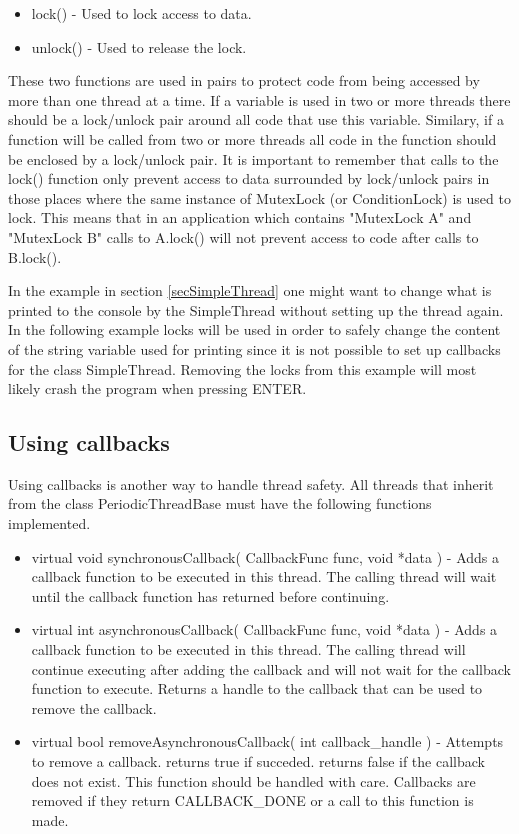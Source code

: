 \begin{itemize}
\item lock() - Used to lock access to data.
\item unlock() - Used to release the lock.
\end{itemize}

These two functions are used in pairs to protect code from being accessed by
more than one thread at a time. If a variable is used in two or more threads
there should be a lock/unlock pair around all code that use this variable. Similary, if a
function will be called from two or more threads all code in the function should
be enclosed by a lock/unlock pair. It is important to remember that calls to
the lock() function only prevent access to data surrounded by lock/unlock pairs
in those places where the same instance of MutexLock (or ConditionLock) is used
to lock. This means that in an application which contains "MutexLock A" and
"MutexLock B" calls to A.lock() will not prevent access to code after calls to
B.lock().

In the example in section \ref{secSimpleThread} one might want to change what
is printed to the console by the SimpleThread without setting up the thread
again. In the following example locks will be used in order to safely change
the content of the string variable used for printing since it is not possible
to set up callbacks for the class SimpleThread. Removing the locks from this
example will most likely crash the program when pressing ENTER.



\subsection{Using callbacks}
Using callbacks is another way to handle thread safety. All threads that
inherit from the class PeriodicThreadBase must have the following functions
implemented.

\begin{itemize}
\item {\ttfamily virtual void synchronousCallback( CallbackFunc func, void *data )} - Adds
  a callback function to be executed in this thread. The calling thread will
  wait until the callback function has returned before continuing.
\item {\ttfamily virtual int asynchronousCallback( CallbackFunc func, void *data )} - Adds
  a callback function to be executed in this thread. The calling thread will
  continue executing after adding the callback and will not wait for the
  callback function to execute. Returns a handle to the callback that can be
  used to remove the callback.
\item {\ttfamily virtual bool removeAsynchronousCallback( int callback\_handle )} - 
  Attempts to remove a callback. returns true if succeded. returns false if
  the callback does not exist. This function should be handled with care.
  Callbacks are removed if they return CALLBACK\_DONE or a call to this
  function is made.
\end{itemize}


